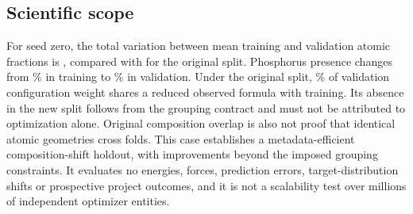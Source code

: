 \subsection{Scientific scope}

For seed zero, the total variation between mean training and validation atomic
fractions is \ODACShiftLow{}, compared with \ODACShiftOriginal{} for the
original split. Phosphorus presence changes from \ODACPhosphorusTrain\% in
training to \ODACPhosphorusVal\% in validation. Under the original split,
\ODACOriginalRepeated\% of validation configuration weight shares a reduced
observed formula with training. Its absence in the new split follows from the
grouping contract and must not be attributed to optimization alone. Original
composition overlap is also not proof that identical atomic geometries cross
folds. This case establishes a metadata-efficient composition-shift holdout,
with improvements beyond the imposed grouping constraints. It evaluates no
energies, forces, prediction errors, target-distribution shifts or prospective
project outcomes, and it is not a scalability test over millions of independent
optimizer entities.
